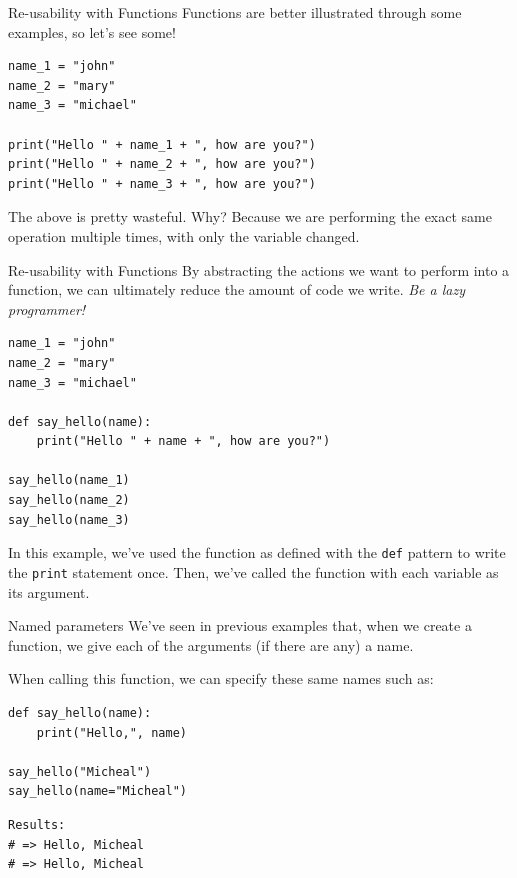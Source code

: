 \documentclass[10pt]{beamer}
\begin{document}
\begin{frame}[label={sec:org0234615},fragile]{Re-usability with Functions}
 Functions are better illustrated through some examples, so let's see some!

\begin{verbatim}
name_1 = "john"
name_2 = "mary"
name_3 = "michael"

print("Hello " + name_1 + ", how are you?")
print("Hello " + name_2 + ", how are you?")
print("Hello " + name_3 + ", how are you?")
\end{verbatim}

The above is pretty wasteful. Why? Because we are performing the exact same
operation multiple times, with only the variable changed.
\end{frame}

\begin{frame}[label={sec:org441c3f4},fragile]{Re-usability with Functions}
 By abstracting the actions we want to perform into a function, we can ultimately
reduce the amount of code we write. \emph{Be a lazy programmer!}

\begin{verbatim}
name_1 = "john"
name_2 = "mary"
name_3 = "michael"

def say_hello(name):
    print("Hello " + name + ", how are you?")

say_hello(name_1)
say_hello(name_2)
say_hello(name_3)
\end{verbatim}

In this example, we've used the function as defined with the \texttt{def} pattern to write
the \texttt{print} statement once. Then, we've called the function with each variable as its
argument.
\end{frame}

\begin{frame}[label={sec:org81daac9},fragile]{Named parameters}
 We've seen in previous examples that, when we create a function, we give each of the
arguments (if there are any) a name.

When calling this function, we can specify these same names such as:

\begin{verbatim}
def say_hello(name):
    print("Hello,", name)

say_hello("Micheal")
say_hello(name="Micheal")
\end{verbatim}

\begin{verbatim}
Results: 
# => Hello, Micheal
# => Hello, Micheal
\end{verbatim}
\end{frame}
\end{document}
